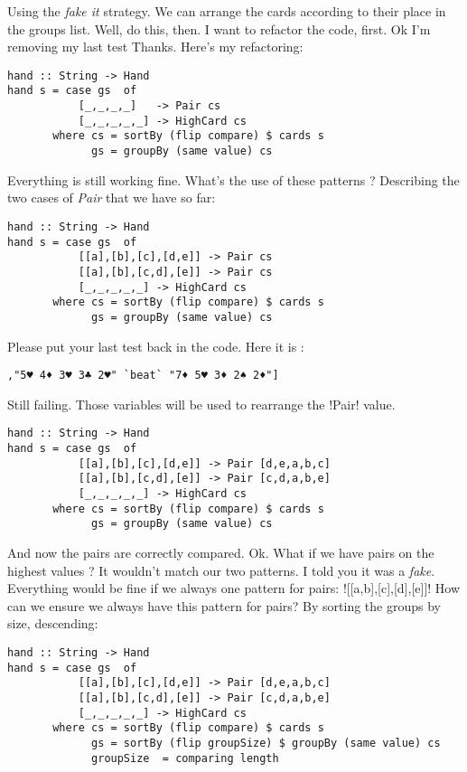 \lhA Using the \emph{fake it} strategy. We can arrange the cards according to their place in the groups list.
\lhN Well, do this, then.
\lhA I want to refactor the code, first. 
\lhN Ok I'm removing my last test
\lhA \success Thanks. Here's my refactoring:
\begin{lstlisting}[frame=single]
hand :: String -> Hand
hand s = case gs  of
           [_,_,_,_]   -> Pair cs
           [_,_,_,_,_] -> HighCard cs 
       where cs = sortBy (flip compare) $ cards s
             gs = groupBy (same value) cs
\end{lstlisting} %
\success Everything is still working fine.
\lhN What's the use of these patterns ?
\lhA \success Describing the two cases of \emph{Pair} that we have so far:
\begin{lstlisting}[frame=single]
hand :: String -> Hand
hand s = case gs  of
           [[a],[b],[c],[d,e]] -> Pair cs
           [[a],[b],[c,d],[e]] -> Pair cs
           [_,_,_,_,_] -> HighCard cs 
       where cs = sortBy (flip compare) $ cards s
             gs = groupBy (same value) cs
\end{lstlisting} %
\success Please put your last test back in the code.
\lhN Here it is :
\begin{lstlisting}[frame=single]
    ,"5♥ 4♦ 3♥ 3♣ 2♥" `beat` "7♦ 5♥ 3♦ 2♠ 2♦"]
\end{lstlisting}
\failure Still failing.
\lhA \failure Those variables will be used to rearrange the \il!Pair! value. 
\begin{lstlisting}[frame=single]
hand :: String -> Hand
hand s = case gs  of
           [[a],[b],[c],[d,e]] -> Pair [d,e,a,b,c]
           [[a],[b],[c,d],[e]] -> Pair [c,d,a,b,e]
           [_,_,_,_,_] -> HighCard cs 
       where cs = sortBy (flip compare) $ cards s
             gs = groupBy (same value) cs
\end{lstlisting} %
\success And now the pairs are correctly compared.
\lhN Ok. What if we have pairs on the highest values ? It wouldn't match our two patterns. 
\lhA I told you it was a \emph{fake}. Everything would be fine if we always one pattern for pairs: \il![[a,b],[c],[d],[e]]!
\lhN How can we ensure we always have this pattern for pairs?
\lhA By sorting the groups by size, descending:
\begin{lstlisting}[frame=single]
hand :: String -> Hand
hand s = case gs  of
           [[a],[b],[c],[d,e]] -> Pair [d,e,a,b,c]
           [[a],[b],[c,d],[e]] -> Pair [c,d,a,b,e]
           [_,_,_,_,_] -> HighCard cs 
       where cs = sortBy (flip compare) $ cards s
             gs = sortBy (flip groupSize) $ groupBy (same value) cs
             groupSize  = comparing length 
\end{lstlisting}
